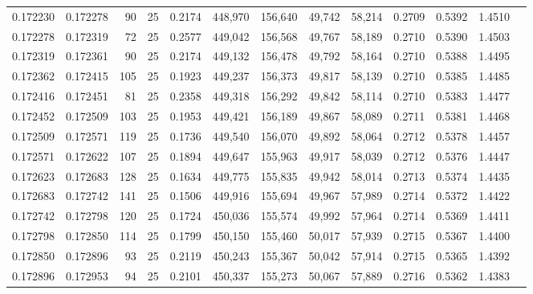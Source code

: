 \begin{tabular}{rrrrrrrrrrrrr}
0.172230 & 0.172278 &    90 &  25 &                                     0.2174 & 448,970 & 156,640 &  49,742 &  58,214 & 0.2709 & 0.5392 & 1.4510 \\
0.172278 & 0.172319 &    72 &  25 &                                     0.2577 & 449,042 & 156,568 &  49,767 &  58,189 & 0.2710 & 0.5390 & 1.4503 \\
0.172319 & 0.172361 &    90 &  25 &                                     0.2174 & 449,132 & 156,478 &  49,792 &  58,164 & 0.2710 & 0.5388 & 1.4495 \\
0.172362 & 0.172415 &   105 &  25 &                                     0.1923 & 449,237 & 156,373 &  49,817 &  58,139 & 0.2710 & 0.5385 & 1.4485 \\
0.172416 & 0.172451 &    81 &  25 &                                     0.2358 & 449,318 & 156,292 &  49,842 &  58,114 & 0.2710 & 0.5383 & 1.4477 \\
0.172452 & 0.172509 &   103 &  25 &                                     0.1953 & 449,421 & 156,189 &  49,867 &  58,089 & 0.2711 & 0.5381 & 1.4468 \\
0.172509 & 0.172571 &   119 &  25 &                                     0.1736 & 449,540 & 156,070 &  49,892 &  58,064 & 0.2712 & 0.5378 & 1.4457 \\
0.172571 & 0.172622 &   107 &  25 &                                     0.1894 & 449,647 & 155,963 &  49,917 &  58,039 & 0.2712 & 0.5376 & 1.4447 \\
0.172623 & 0.172683 &   128 &  25 &                                     0.1634 & 449,775 & 155,835 &  49,942 &  58,014 & 0.2713 & 0.5374 & 1.4435 \\
0.172683 & 0.172742 &   141 &  25 &                                     0.1506 & 449,916 & 155,694 &  49,967 &  57,989 & 0.2714 & 0.5372 & 1.4422 \\
0.172742 & 0.172798 &   120 &  25 &                                     0.1724 & 450,036 & 155,574 &  49,992 &  57,964 & 0.2714 & 0.5369 & 1.4411 \\
0.172798 & 0.172850 &   114 &  25 &                                     0.1799 & 450,150 & 155,460 &  50,017 &  57,939 & 0.2715 & 0.5367 & 1.4400 \\
0.172850 & 0.172896 &    93 &  25 &                                     0.2119 & 450,243 & 155,367 &  50,042 &  57,914 & 0.2715 & 0.5365 & 1.4392 \\
0.172896 & 0.172953 &    94 &  25 &                                     0.2101 & 450,337 & 155,273 &  50,067 &  57,889 & 0.2716 & 0.5362 & 1.4383 \\

\end{tabular}

